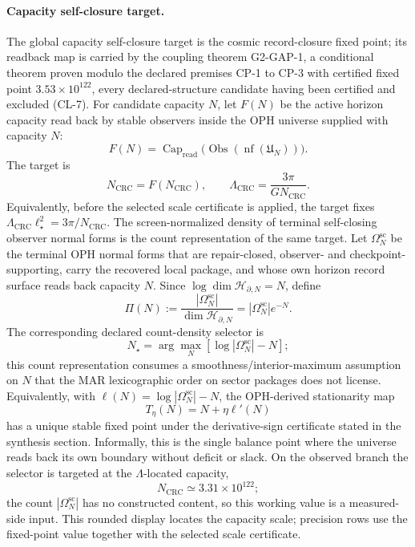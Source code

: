 \paragraph{\textbf{Capacity self-closure target.}}
The global capacity self-closure target is the cosmic record-closure fixed point; its readback map is carried by the coupling theorem G2-GAP-1, a conditional theorem proven modulo the declared premises CP-1 to CP-3 with certified fixed point \(3.53\times10^{122}\), every declared-structure candidate having been certified and excluded (CL-7). For candidate capacity
\(N\), let \(F(N)\) be the active horizon capacity read back by
stable observers inside the OPH universe supplied with capacity \(N\):
\[
F(N)=
\operatorname{Cap}_{\mathrm{read}}
\bigl(\operatorname{Obs}(\operatorname{nf}(\mathfrak U_N))\bigr).
\]
The target is
\[
N_{\mathrm{CRC}}=F(N_{\mathrm{CRC}}),
\qquad
\Lambda_{\mathrm{CRC}}=\frac{3\pi}{G N_{\mathrm{CRC}}}.
\]
Equivalently, before the selected scale certificate is applied, the target fixes
\(\Lambda_{\mathrm{CRC}}\ell_\star^2=3\pi/N_{\mathrm{CRC}}\).
The screen-normalized density of terminal self-closing observer normal forms is the count
representation of the same target. Let \(\Omega^{\mathrm{sc}}_N\) be the terminal OPH normal forms
that are repair-closed, observer- and checkpoint-supporting, carry the recovered local package, and
whose own horizon record surface reads back capacity \(N\). Since
\(\log\dim\mathcal H_{\partial,N}=N\), define
\[
\Pi(N):=\frac{|\Omega^{\mathrm{sc}}_N|}{\dim\mathcal H_{\partial,N}}
=|\Omega^{\mathrm{sc}}_N|e^{-N}.
\]
The corresponding declared count-density selector is
\[
N_\star=\arg\max_N\left[\log|\Omega^{\mathrm{sc}}_N|-N\right];
\]
this count representation consumes a smoothness/interior-maximum assumption on \(N\) that the
MAR lexicographic order on sector packages does not license.
Equivalently, with \(\ell(N)=\log|\Omega^{\mathrm{sc}}_N|-N\), the OPH-derived stationarity map
\[
T_\eta(N)=N+\eta\ell'(N)
\]
has a unique stable fixed point under the derivative-sign certificate stated in the synthesis
section. Informally, this is the single balance point where the universe reads back its own
boundary without deficit or slack. On the observed branch the selector is targeted at the
\(\Lambda\)-located capacity,
\[
N_{\mathrm{CRC}}\simeq3.31\times10^{122};
\]
the count \(|\Omega^{\mathrm{sc}}_N|\) has no constructed content, so this working value is a
measured-side input.
This rounded display locates the capacity scale; precision rows use the fixed-point value together
with the selected scale certificate.

